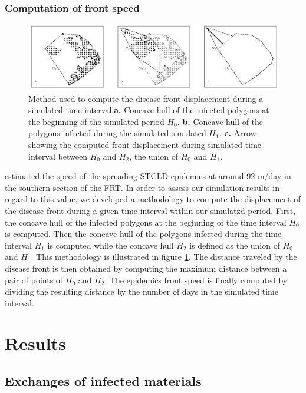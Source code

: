 \documentclass[utf8]{frontiersSCNS}
\begin{document}
\subsubsection{Computation of front speed}

\begin{figure}
    \centering
    \includegraphics[width=.99\linewidth]{figures/hull_example.png}
    \caption{Method used to compute the disease front displacement during a simulated time interval.\textbf{a.} Concave hull of the infected polygons at the beginning of the simulated period $H_0$. \textbf{b.} Concave hull of the polygons infected during the simulated simulated $H_1$. \textbf{c.} Arrow showing the computed front displacement during simulated time interval between $H_0$ and $H_2$, the union of $H_0$ and $H_1$.}
    \label{fig:hull}
\end{figure}

\cite{muller2020spatial} estimated the speed of the spreading STCLD epidemics at around 92 m/day in the southern section of the FRT. In order to assess our simulation results in regard to this value, we developed a methodology to compute the displacement of the disease front during a given time interval within our simulatzd period. First, the concave hull of the infected polygons at the beginning of the time interval $H_0$ is computed. Then the concave hull of the polygons infected during the time interval $H_1$ is computed while the concave hull $H_2$ is defined as the union of $H_0$ and $H_1$. This methodology is illustrated in figure \ref{fig:hull}. The distance traveled by the disease front is then obtained by computing the maximum distance between a pair of points of $H_0$ and $H_2$. The epidemics front speed is finally computed by dividing the resulting distance by the number of days in the simulated time interval.

\section{Results}

\subsection{Exchanges of infected materials}
\end{document}
